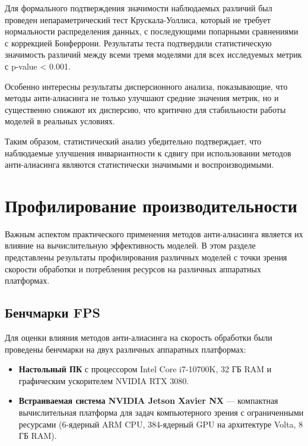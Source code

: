 Для формального подтверждения значимости наблюдаемых различий был проведен непараметрический тест Крускала-Уоллиса, который не требует нормальности распределения данных, с последующими попарными сравнениями с коррекцией Бонферрони. Результаты теста подтвердили статистическую значимость различий между всеми тремя моделями для всех исследуемых метрик с p-value < 0.001.

Особенно интересны результаты дисперсионного анализа, показывающие, что методы анти-алиасинга не только улучшают средние значения метрик, но и существенно снижают их дисперсию, что критично для стабильности работы моделей в реальных условиях.

Таким образом, статистический анализ убедительно подтверждает, что наблюдаемые улучшения инвариантности к сдвигу при использовании методов анти-алиасинга являются статистически значимыми и воспроизводимыми. 

\section{Профилирование производительности}
\label{experiments:performance}

Важным аспектом практического применения методов анти-алиасинга является их влияние на вычислительную эффективность моделей. В этом разделе представлены результаты профилирования различных моделей с точки зрения скорости обработки и потребления ресурсов на различных аппаратных платформах.

\subsection{Бенчмарки FPS}
\label{experiments:performance:fps}

Для оценки влияния методов анти-алиасинга на скорость обработки были проведены бенчмарки на двух различных аппаратных платформах:

\begin{itemize}
    \item \textbf{Настольный ПК} с процессором Intel Core i7-10700K, 32 ГБ RAM и графическим ускорителем NVIDIA RTX 3080.
    
    \item \textbf{Встраиваемая система NVIDIA Jetson Xavier NX} — компактная вычислительная платформа для задач компьютерного зрения с ограниченными ресурсами (6-ядерный ARM CPU, 384-ядерный GPU на архитектуре Volta, 8 ГБ RAM).
\end{itemize}

